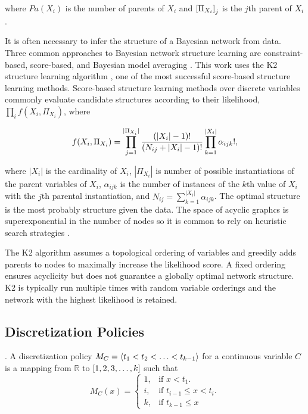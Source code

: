 \noindent
where $Pa(X_i)$ is the number of parents of $X_i$ and $\brock{\Pi_{X_i}}_j$ is the $j$th parent of $X_i$.

It is often necessary to infer the structure of a Bayesian network from data.
Three common approaches to Bayesian network structure learning are constraint-based, score-based, and Bayesian model averaging \citep[see][chap.~18]{PGM_2009}. This work uses the K2 structure learning algorithm \citep{K2}, one of the most successful score-based structure learning methods.
Score-based structure learning methods over discrete variables commonly evaluate candidate structures according to their likelihood, $\prod_i f(X_i, \Pi_{X_i})$, where

\begin{align}
f(X_i, \Pi_{X_i}) = \prod_{j=1}^{|\Pi_{X_i}|} {{(|X_i|-1)!}\over{(N_{ij} + |X_i|-1)!}} \prod_{k=1}^{|X_i|} \alpha_{ijk}!\text{,}
\end{align}

\noindent
where $|X_i|$ is the cardinality of $X_i$, $|\Pi_{X_i}|$ is number of possible instantiations of the parent variables of $X_i$, $\alpha_{ijk}$ is the number of instances of the $k$th value of $X_i$ with the $j$th parental instantiation, and $N_{ij} = \sum_{k=1}^{|X_i|} \alpha_{ijk}$.
The optimal structure is the most probably structure given the data.
The space of acyclic graphcs is superexponential in the number of nodes so it is common to rely on heuristic search strategies \citep{PGM_2009}.

The K2 algorithm assumes a topological ordering of variables and greedily adds parents to nodes to maximally increase the likelihood score.
A fixed ordering ensures acyclicity but does not guarantee a globally optimal network structure.
K2 is typically run multiple times with random variable orderings and the network with the highest likelihood is retained.

\subsection{Discretization Policies}

.
A discretization policy $M_C = \langle t_1 < t_2 < \ldots < t_{k-1} \rangle$ for a continuous variable $C$ is a mapping from $\mathbb{R}$ to $\brock{1,2,3,\ldots,k}$ such that
\begin{equation}
  M_C (x)=\begin{cases}
    1, & \text{if $x<t_1$}.\\
    i, & \text{if $t_{i-1} \leq x < t_i$}\text{.}\\
    k, & \text{if $t_{k-1} \leq x$}
  \end{cases}
\end{equation}


